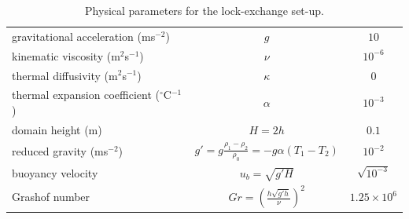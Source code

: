 \begin{table}[th]
\centering
\begin{tabular}[h]{l   c  c }  \hline
gravitational acceleration (ms$^{-2}$)			& $g$ 								& $10$  \\
kinematic viscosity (m$^2$s$^{-1}$)			& $\nu$								& $10^{-6}$  \\
thermal diffusivity (m$^2$s$^{-1}$)					& $\kappa$ 					& 0  \\
thermal expansion coefficient ($^\circ$C$^{-1}$)	& $\alpha$ 							& $10^{-3}$ \\ 
domain height (m)					& $H = 2h$							& $0.1$ \\ %
reduced gravity	(ms$^{-2}$)				& $g' = g\frac{\rho_1 - \rho_2}{\rho_0} = -g\alpha (T_1 - T_2)$	& $10^{-2}$  \\
buoyancy velocity					& $u_b = \sqrt{g'H}$ 						& $\sqrt{10^{-3}}$ \\
Grashof number						& $Gr = \left( \frac{h \sqrt{g'h}}{\nu} \right)^2$ 		& $1.25 \times 10^{6}$\\ \hline
\end{tabular}
\caption{Physical parameters for the lock-exchange set-up.}
\label{tab:le_physical_parameters}
\end{table}

